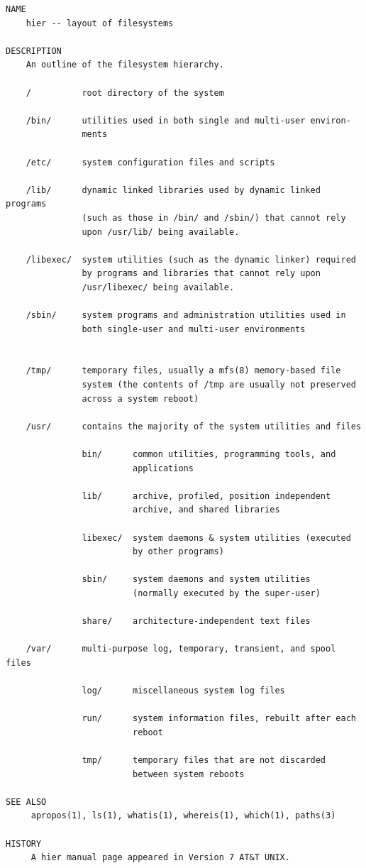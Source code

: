 \begin{lstlisting}[float,basicstyle=\scriptsize,label=code:hier,caption={Excerpt of the {\tt hier(7)} manual page.}]
NAME
    hier -- layout of filesystems

DESCRIPTION
    An outline of the filesystem hierarchy.

    /          root directory of the system

    /bin/      utilities used in both single and multi-user environ-
               ments

    /etc/      system configuration files and scripts

    /lib/      dynamic linked libraries used by dynamic linked programs
               (such as those in /bin/ and /sbin/) that cannot rely
               upon /usr/lib/ being available.

    /libexec/  system utilities (such as the dynamic linker) required
               by programs and libraries that cannot rely upon
               /usr/libexec/ being available.

    /sbin/     system programs and administration utilities used in
               both single-user and multi-user environments


    /tmp/      temporary files, usually a mfs(8) memory-based file
               system (the contents of /tmp are usually not preserved
               across a system reboot)

    /usr/      contains the majority of the system utilities and files

               bin/      common utilities, programming tools, and
                         applications

               lib/      archive, profiled, position independent
                         archive, and shared libraries

               libexec/  system daemons & system utilities (executed
                         by other programs)

               sbin/     system daemons and system utilities
                         (normally executed by the super-user)

               share/    architecture-independent text files

    /var/      multi-purpose log, temporary, transient, and spool files

               log/      miscellaneous system log files

               run/      system information files, rebuilt after each
                         reboot

               tmp/      temporary files that are not discarded
                         between system reboots

SEE ALSO
     apropos(1), ls(1), whatis(1), whereis(1), which(1), paths(3)

HISTORY
     A hier manual page appeared in Version 7 AT&T UNIX.
\end{lstlisting}

